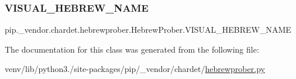 \subsubsection{\texorpdfstring{V\+I\+S\+U\+A\+L\+\_\+\+H\+E\+B\+R\+E\+W\+\_\+\+N\+A\+ME}{VISUAL\_HEBREW\_NAME}}
{\footnotesize\ttfamily pip.\+\_\+vendor.\+chardet.\+hebrewprober.\+Hebrew\+Prober.\+V\+I\+S\+U\+A\+L\+\_\+\+H\+E\+B\+R\+E\+W\+\_\+\+N\+A\+ME\hspace{0.3cm}{\ttfamily [static]}}



The documentation for this class was generated from the following file\+:\begin{DoxyCompactItemize}
\item 
venv/lib/python3./site-\/packages/pip/\+\_\+vendor/chardet/\hyperlink{hebrewprober_8py}{hebrewprober.\+py}\end{DoxyCompactItemize}
